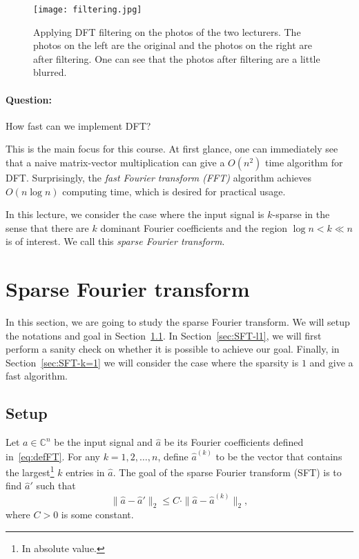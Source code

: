 \documentclass[11pt]{article}
\newcommand{\C}{\mathbb{C}}
\begin{document}
\begin{figure}[h]
	\centering
	\texttt{[image: filtering.jpg]}
	\caption{Applying DFT filtering on the photos of the two lecturers. The photos on the left are the original and the photos on the right are after filtering. One can see that the photos after filtering are a little blurred.}
	\label{fig:filtering}
\end{figure}


\paragraph{Question:} How fast can we implement DFT?

This is the main focus for this course. At first glance, one can immediately see that a naive matrix-vector multiplication can give a $O(n^2)$ time algorithm for DFT. Surprisingly, the \textit{fast Fourier transform (FFT)} algorithm achieves $O(n\log n)$ computing time, which is desired for practical usage.

In this lecture, we consider the case where the input signal is $k$-sparse in the sense that there are $k$ dominant Fourier coefficients and the region $\log n<k\ll n$ is of interest. We call this \textit{sparse Fourier transform}.

\section{Sparse Fourier transform}\label{sec:SFT}
In this section, we are going to study the sparse Fourier transform. We will setup the notations and goal in Section~\ref{sec:SFT-setup}. In Section~\ref{sec:SFT-l1}, we will first perform a sanity check on whether it is possible to achieve our goal. Finally, in Section~\ref{sec:SFT-k=1} we will consider the case where the sparsity is $1$ and give a fast algorithm.

\subsection{Setup}\label{sec:SFT-setup}
Let $a\in\C^n$ be the input signal and $\hat{a}$ be its Fourier coefficients defined in~\eqref{eq:defFT}. For any $k=1,2,\dots,n$, define $\hat{a}^{(k)}$ to be the vector that contains the largest\footnote{In absolute value.} $k$ entries in $\hat{a}$. The goal of the sparse Fourier transform (SFT) is to find $\hat{a}'$ such that
\begin{equation}\label{eq:goalSFT}
\|\hat{a}-\hat{a}'\|_2\leq C\cdot\|\hat{a}-\hat{a}^{(k)}\|_2,
\end{equation}
where $C>0$ is some constant.
\end{document}
